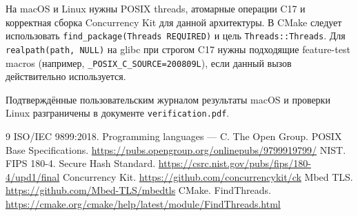 \documentclass[12pt,a4paper]{article}
\begin{document}
На macOS и Linux нужны POSIX threads, атомарные операции C17 и корректная
сборка Concurrency Kit для данной архитектуры. В CMake следует использовать
\texttt{find\_package(Threads REQUIRED)} и цель \texttt{Threads::Threads}.
Для \texttt{realpath(path, NULL)} на glibc при строгом C17 нужны подходящие
feature-test macros (например, \texttt{\_POSIX\_C\_SOURCE=200809L}),
если данный вызов действительно используется.

Подтверждённые пользовательским журналом результаты macOS и проверки Linux
разграничены в документе \texttt{verification.pdf}.

\clearpage
{}
\begingroup
\footnotesize
\setlength{\parskip}{0pt}
\begin{thebibliography}{9}
 ISO/IEC 9899:2018. Programming languages --- C.
 The Open Group. POSIX Base Specifications. \url{https://pubs.opengroup.org/onlinepubs/9799919799/}
 NIST. FIPS 180-4. Secure Hash Standard. \url{https://csrc.nist.gov/pubs/fips/180-4/upd1/final}
 Concurrency Kit. \url{https://github.com/concurrencykit/ck}
 Mbed TLS. \url{https://github.com/Mbed-TLS/mbedtls}
 CMake. FindThreads. \url{https://cmake.org/cmake/help/latest/module/FindThreads.html}
\end{thebibliography}
\endgroup
\end{document}
